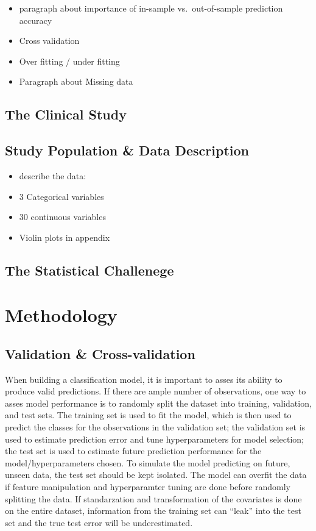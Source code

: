 \documentclass[12pt,]{article}
\providecommand{\tightlist}{%
  \setlength{\itemsep}{0pt}\setlength{\parskip}{0pt}}
\begin{document}
\begin{itemize}
\item
  paragraph about importance of in-sample vs.~out-of-sample prediction
  accuracy
\item
  Cross validation
\item
  Over fitting / under fitting
\item
  Paragraph about Missing data
\end{itemize}

\subsection{The Clinical Study}\label{the-clinical-study}

\subsection{Study Population \& Data
Description}\label{study-population-data-description}

\begin{itemize}
\tightlist
\item
  describe the data:
\item
  3 Categorical variables
\item
  30 continuous variables
\item
  Violin plots in appendix
\end{itemize}

\subsection{The Statistical
Challenege}\label{the-statistical-challenege}

\newpage

\section{Methodology}\label{methodology}

\subsection{Validation \&
Cross-validation}\label{validation-cross-validation}

When building a classification model, it is important to asses its
ability to produce valid predictions. If there are ample number of
observations, one way to asses model performance is to randomly split
the dataset into training, validation, and test sets. The training set
is used to fit the model, which is then used to predict the classes for
the observations in the validation set; the validation set is used to
estimate prediction error and tune hyperparameters for model selection;
the test set is used to estimate future prediction performance for the
model/hyperparameters chosen. To simulate the model predicting on
future, unseen data, the test set should be kept isolated. The model can
overfit the data if feature manipulation and hyperparamter tuning are
done before randomly splitting the data. If standarzation and
transformation of the covariates is done on the entire dataset,
information from the training set can ``leak'' into the test set and the
true test error will be underestimated.
\end{document}
